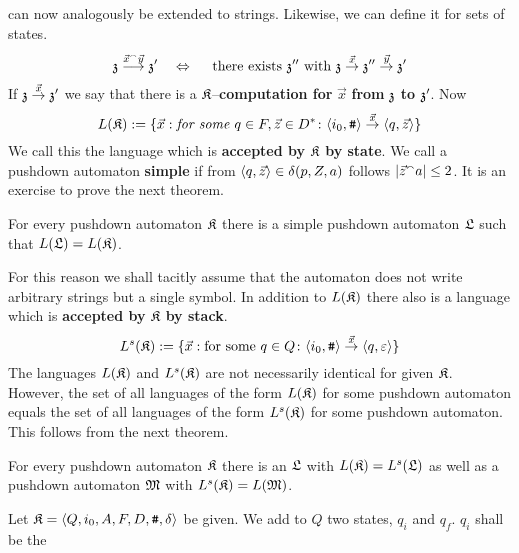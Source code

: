 can now analogously be extended to strings. Likewise, we can
define it for sets of states. 
\begin{equation}
\mathfrak{z} \stackrel{\vec{x} {^{\smallfrown}} \vec{y}}{\longrightarrow} \mathfrak{z}'
\quad\Leftrightarrow\quad
\text{ there exists }\mathfrak{z}'' \text{ with }
\mathfrak{z} \stackrel{\vec{x}}{\rightarrow} \mathfrak{z}'' \stackrel{\vec{y}}{\rightarrow} \mathfrak{z}'
\end{equation}
If $\mathfrak{z} \stackrel{\vec{x}}{\rightarrow} \mathfrak{z}'$ we say that there is a
$\mathfrak{K}$--\textbf{computation for} $\vec{x}$ \textbf{from} $\mathfrak{z}$ 
\textbf{to} $\mathfrak{z}'$. Now
\begin{equation}
L(\mathfrak{K}) := \{\vec{x} : \text{\it for some }
q \in F, \vec{z} \in D^{\ast} \colon
\langle i_0, \mbox{\tt \#} \rangle \stackrel{\vec{x}}{\rightarrow} 
\langle q, \vec{z}\rangle\}
\end{equation}
We call this the language which is \textbf{accepted by} $\mathfrak{K}$ 
\textbf{by state}. We call a pushdown automaton \textbf{simple} if from
$\langle q, \vec{z}\rangle \in \delta(p,Z,a)$ follows $|\vec{z}{^{\smallfrown}} a| \leq 2$.
It is an exercise to prove the next theorem.
\begin{prop}
\label{prop:einfach}
For every pushdown automaton $\mathfrak{K}$ there is a simple
pushdown automaton $\mathfrak{L}$ such that $L(\mathfrak{L}) = L(\mathfrak{K})$.
\end{prop}
For this reason we shall tacitly assume that the automaton
does not write arbitrary strings but a single symbol. In addition
to $L(\mathfrak{K})$ there also is a language which is \textbf{accepted  by}
$\mathfrak{K}$ \textbf{by stack}.
\begin{equation}
L^s(\mathfrak{K}) := \{\vec{x} : \text{for some } q \in Q \colon
\langle i_0, \mbox{\tt \#}\rangle \stackrel{\vec{x}}{\rightarrow} \langle q, \varepsilon\rangle\}
\end{equation}
The languages $L(\mathfrak{K})$ and $L^s(\mathfrak{K})$ are not necessarily
identical for given $\mathfrak{K}$. However, the set of all languages of the
form $L(\mathfrak{K})$ for some pushdown automaton equals the set of all
languages of the form $L^s(\mathfrak{K})$ for some pushdown automaton.
This follows from the next theorem.
\begin{prop}
For every pushdown automaton $\mathfrak{K}$ there is an $\mathfrak{L}$ with
$L(\mathfrak{K}) = L^s(\mathfrak{L})$ as well as a pushdown automaton $\mathfrak{M}$ with
$L^s(\mathfrak{K}) = L(\mathfrak{M})$.
\end{prop}
\proofbeg
Let $\mathfrak{K} = \langle Q, i_0, A, F, D, \mbox{\tt \#}, \delta\rangle$ be given.
We add to $Q$ two states, $q_i$ and $q_f$. $q_i$ shall be the
